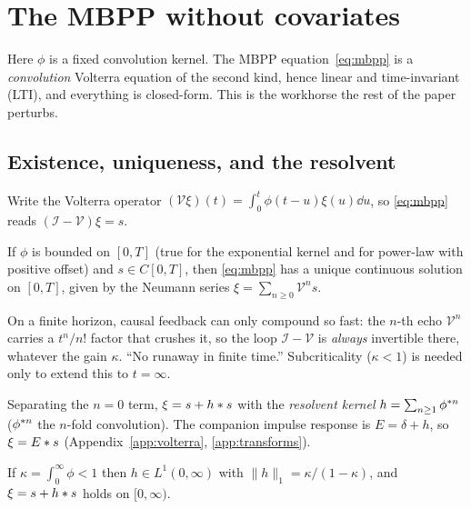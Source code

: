 \section{The MBPP without covariates}
\label{sec:no-covariates}

Here $\phi$ is a fixed convolution kernel. The MBPP equation~\eqref{eq:mbpp} is a
\emph{convolution} Volterra equation of the second kind, hence linear and
time-invariant (LTI), and everything is closed-form. This is the workhorse the
rest of the paper perturbs.

\subsection{Existence, uniqueness, and the resolvent}

Write the Volterra operator $(\mathcal V\xi)(t)=\int_0^t\phi(t-u)\xi(u)\dd u$, so
\eqref{eq:mbpp} reads $(\mathcal I-\mathcal V)\xi=s$.

\begin{theorem}\label{thm:exist}
If $\phi$ is bounded on $[0,T]$ (true for the exponential kernel and for power-law
with positive offset) and $s\in C[0,T]$, then \eqref{eq:mbpp} has a unique
continuous solution on $[0,T]$, given by the Neumann series
$\xi=\sum_{n\ge0}\mathcal V^n s$.
\end{theorem}

\begin{intuition}
On a finite horizon, causal feedback can only compound so fast: the $n$-th echo
$\mathcal V^n$ carries a $t^n/n!$ factor that crushes it, so the loop
$\mathcal I-\mathcal V$ is \emph{always} invertible there, whatever the gain
$\kappa$. ``No runaway in finite time.'' Subcriticality ($\kappa<1$) is needed only
to extend this to $t=\infty$.
\end{intuition}

Separating the $n=0$ term, $\xi=s+h\ast s$ with the \emph{resolvent kernel}
$h=\sum_{n\ge1}\phi^{\ast n}$ ($\phi^{\ast n}$ the $n$-fold convolution). The
companion impulse response is $E=\delta+h$, so $\xi=E\ast s$
(Appendix~\ref{app:volterra}, \ref{app:transforms}).

\begin{proposition}\label{prop:resolvent}
If $\kappa=\int_0^\infty\phi<1$ then $h\in L^1(0,\infty)$ with
$\|h\|_1=\kappa/(1-\kappa)$, and $\xi=s+h\ast s$ holds on $[0,\infty)$.
\end{proposition}

